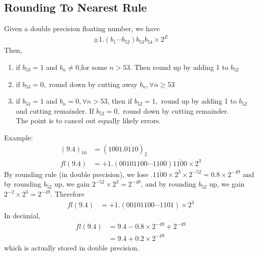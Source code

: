 \documentclass[11pt,oneside]{book}
\theoremstyle{break}
\theoremstyle{break}
\newcommand{\example}{\color{purple}Example: \color{black}}
\begin{document}
\subsection[Rounding To Nearest Rule]{Rounding To Nearest Rule}
Given a double precision floating number, we have \begin{align*}
\pm 1.(b_1\cdots b_{52})b_{53}b_{54}\times 2^E
\end{align*}
Then, \begin{enumerate}
\item if $b_{53}=1$ and $b_n\neq 0$,for some $ n> 53.$ Then round up by adding 1 to $b_{52}$
\item if $b_{53}=0,$ round down by cutting away $b_{n},\forall n\geq 53$
\item if $b_{53}=1$  and $b_{n}=0,\forall n >53$, then if $b_{52}=1,$ round up by adding 1 to $b_{52}$ and cutting remainder. If $b_{52}=0,$ round down by cutting remainder.\\
The point is to cancel out equally likely errors.
\end{enumerate}
\example \begin{align*}
(9.4)_{10}&=(1001.\overline{0110})_{2}\\
fl(9.4)&= +1.(0010 1100\cdots 1100)\overline{1100}\times 2^3
\end{align*}
By rounding rule (in double precision), we lose $.\overline{1100}\times 2^3\times 2^{-52}=0.8\times 2^{-49}$ and by rounding $b_{52}$ up, we gain $2^{-52}\times 2^3=2^{-49}$, and by rounding $b_{52}$ up, we gain $2^{-2}\times 2^3=2^{-49}$. Therefore \begin{align*}
fl(9.4)&= +1.(0010 1100\cdots 1101)\times 2^3
\end{align*}
In decimial, \begin{align*}
fl(9.4)&=9.4-0.8\times 2^{-49}+2^{-49}\\
&=9.4+0.2\times 2^{-49}
\end{align*}
which is actually stored in double precision.\\
\hfill\\
\end{document}
